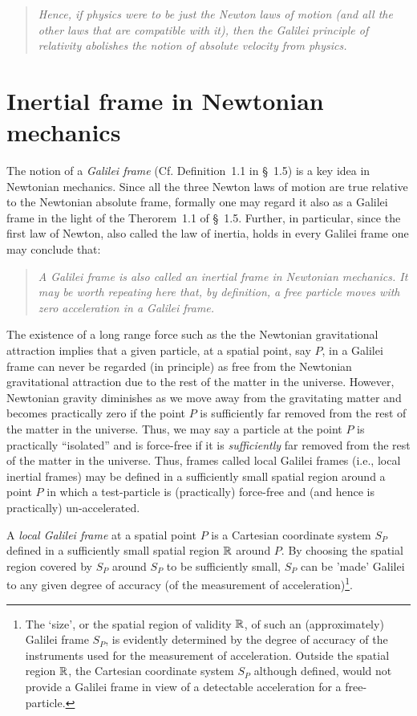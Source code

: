 \begin{quote}
\textsl{Hence, if physics were to be just the Newton 
laws of motion (and all the other laws that are compatible 
with it), then the Galilei principle of relativity abolishes 
the notion of absolute velocity from physics.}
\end{quote}

\vspace{-.3cm}

\section{Inertial frame in Newtonian\\ mechanics} 
The notion of a \textsl{Galilei frame} (Cf. Definition~1.1 
in \S~1.5) is a  key idea in Newtonian mechanics. Since  all 
the three Newton laws of motion are true relative to the 
Newtonian absolute frame, formally one may regard it also as 
a Galilei frame in the light of the Therorem~1.1 of  \S~1.5. 
Further, in particular, since the first law of Newton, 
also called the law of inertia, holds in every Galilei 
frame one may conclude that:
\begin{quote}
\textsl{A Galilei frame is also called an inertial  frame 
in Newtonian mechanics. It may be worth repeating here 
that, by definition, a \textsl{free particle} moves with 
zero acceleration in a Galilei frame.} 
\end{quote}

The existence of a long range force such as the the 
Newtonian gravitational attraction implies that a given 
particle, at a spatial point, say $P$, in a Galilei frame 
can never be regarded (in principle) as free from the 
Newtonian gravitational attraction due to the rest of the 
matter in the universe. However, Newtonian gravity 
diminishes as we move away from the gravitating matter 
and becomes practically zero if the point $P$ is 
sufficiently far removed from the rest of the matter in 
the universe. Thus, we may say a particle at the point 
$P$ is practically ``isolated'' and is force-free if it 
is \textsl{sufficiently} far removed from the rest of 
the matter in the universe. Thus, frames called local 
Galilei frames (i.e., local inertial frames) may be 
defined in a sufficiently small spatial region around 
a point $P$ in which a test-particle is (practically) 
force-free and (and hence is practically) 
un-accelerated.

\vspace{.2cm}
\dfn A \textsl{local Galilei frame} at a spatial point 
$P$ is a Cartesian coordinate system $S_P$ defined in 
a sufficiently small spatial region $\mathbb{R}$ around 
$P$. By choosing the spatial region covered by  $S_P$ 
around $S_P$ to be sufficiently small,  $S_P$ can be 
'made' Galilei to any  given  degree of accuracy (of 
the measurement of acceleration)\footnote{ The `size', 
or the spatial region of validity $\mathbb{R}$, of such 
an (approximately) Galilei frame $S_P$, is evidently 
determined by the degree of accuracy of the instruments 
used for the measurement of acceleration. Outside the 
spatial region $\mathbb{R}$, the Cartesian coordinate 
system $S_P$ although defined, would not provide a 
Galilei frame in view of a detectable acceleration for 
a free-particle.}.

